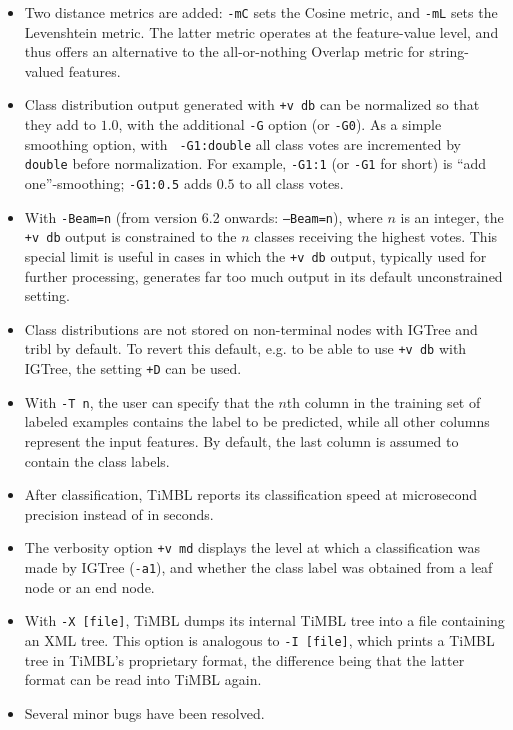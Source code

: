 \documentclass{report}
\begin{document}
\begin{itemize}

\item Two distance metrics are added: {\tt -mC} sets the Cosine
  metric, and {\tt -mL} sets the Levenshtein metric. The latter metric
  operates at the feature-value level, and thus offers an alternative
  to the all-or-nothing Overlap metric for string-valued features. 

\item Class distribution output generated with {\tt +v db} can be
  normalized so that they add to $1.0$, with the additional {\tt -G}
  option (or {\tt -G0}). As a simple smoothing option, with {\tt
    -G1:double} all class votes are incremented by {\tt double} before
  normalization.  For example, {\tt -G1:1} (or {\tt -G1} for short) is
  ``add one''-smoothing; {\tt -G1:0.5} adds $0.5$ to all class votes.

\item With {\tt -Beam=n} (from version 6.2 onwards: {\tt --Beam=n}),
  where $n$ is an integer, the {\tt +v db} output is constrained to
  the $n$ classes receiving the highest votes. This special limit is
  useful in cases in which the {\tt +v db} output, typically used for
  further processing, generates far too much output in its default
  unconstrained setting.

\item Class distributions are not stored on non-terminal nodes with
  {\sc IGTree} and {\sc tribl} by default. To revert this default,
  e.g. to be able to use {\tt +v db} with {\sc IGTree}, the setting
  {\tt +D} can be used.

\item With {\tt -T n}, the user can specify that the $n$th column in
  the training set of labeled examples contains the label to be
  predicted, while all other columns represent the input features. By
  default, the last column is assumed to contain the class labels.

\item After classification, TiMBL reports its classification speed at
  microsecond precision instead of in seconds.

\item The verbosity option {\tt +v md} displays the level at which a
  classification was made by {\sc IGTree} ({\tt -a1}), and whether the
  class label was obtained from a leaf node or an end node.

\item With {\tt -X [file]}, TiMBL dumps its internal TiMBL tree into a
  file containing an XML tree. This option is analogous to {\tt -I
    [file]}, which prints a TiMBL tree in TiMBL's proprietary format,
  the difference being that the latter format can be read into TiMBL
  again.

\item Several minor bugs have been resolved.

\end{itemize}
\end{document}
